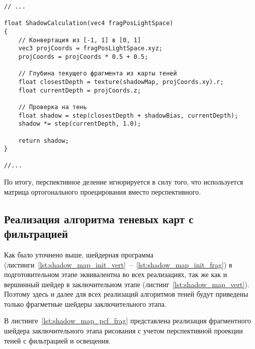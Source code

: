 \begin{center}
\captionsetup{justification=centering, singlelinecheck=off}
\begin{lstlisting}[label=lst:shadow_map_frag_ortho, caption=Фрагментный шейдер с учетом ортогонального проецирония теней]
// ...

float ShadowCalculation(vec4 fragPosLightSpace)
{
    // Конвертация из [-1, 1] в [0, 1]
    vec3 projCoords = fragPosLightSpace.xyz;
    projCoords = projCoords * 0.5 + 0.5;

    // Глубина текущего фрагмента из карты теней
    float closestDepth = texture(shadowMap, projCoords.xy).r; 
    float currentDepth = projCoords.z;

    // Проверка на тень
    float shadow = step(closestDepth + shadowBias, currentDepth);
    shadow *= step(currentDepth, 1.0);

    return shadow;
}

//...
\end{lstlisting}
\end{center}

По итогу, перспективное деление игнорируется в силу того, что используется
матрица ортогонального проецирования вместо перспективного.

\subsection{Реализация алгоритма теневых карт с фильтрацией}

Как было уточнено выше, шейдерная программа
(листинги~\ref{lst:shadow_map_init_vert}~--~\ref{lst:shadow_map_init_frag})
в подготовительном этапе эквивалентна во всех реализациях,
так же как и вершинный шейдер в заключительном этапе
(листинг~\ref{lst:shadow_map_vert}). Поэтому здесь и далее для всех
реализаций алгоритмов теней будут приведены только фрагметные шейдеры
заключительного этапа.

В листинге~\ref{lst:shadow_map_pcf_frag} представлена реализация фрагментного шейдера заключительного
этапа рисования с учетом перспективной проекции теней с фильтрацией и освещения.

